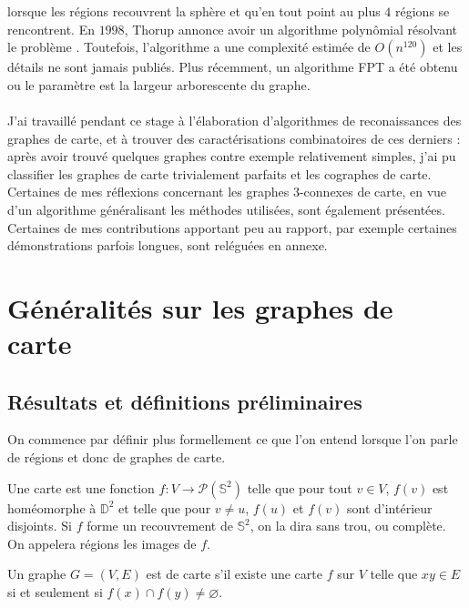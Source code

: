 \documentclass{scrartcl}
\begin{document}
\begin{flushleft}
lorsque les régions recouvrent la sphère et qu'en tout point au plus $4$ régions se rencontrent. En $1998$, Thorup annonce avoir un algorithme
polynômial résolvant le problème \cite{Thorup}. Toutefois, l'algorithme a une complexité estimée de $O(n^{120})$ \cite{n120} et les détails ne
sont jamais publiés. Plus récemment, un algorithme FPT a été obtenu \cite{FptMap} ou le paramètre est la largeur arborescente du graphe.
\\~\\
J'ai travaillé pendant ce stage à l'élaboration d'algorithmes de reconaissances des graphes de carte, et à trouver des caractérisations
combinatoires de ces derniers : après avoir trouvé quelques graphes contre exemple relativement simples, j'ai pu classifier les graphes
de carte trivialement parfaits et les cographes de carte. Certaines de mes réflexions concernant les graphes $3$-connexes de carte, en vue
d'un algorithme généralisant les méthodes utilisées, sont également présentées. Certaines de mes contributions apportant peu au rapport,
par exemple certaines démonstrations parfois longues, sont reléguées en annexe.

\section{Généralités sur les graphes de carte}

\subsection{Résultats et définitions préliminaires}

On commence par définir plus formellement ce que l'on entend lorsque l'on parle de régions et donc de graphes de carte.

\begin{def*}[Carte]
    Une carte est une fonction $f : V \rightarrow \mathcal{P}(\mathbb{S}^2)$ telle que pour tout $v \in V$, $f(v)$
    est homéomorphe à $\mathbb{D}^2$ et telle que pour $v \neq u$, $f(u)$ et $f(v)$ sont d'intérieur disjoints. Si
    $f$ forme un recouvrement de $\mathbb{S}^2$, on la dira sans trou, ou complète. On appelera régions les images
    de $f$.
\end{def*}

\begin{def*}
    Un graphe $G = (V, E)$ est de carte s'il existe une carte $f$ sur $V$ telle que $xy \in E$ si et seulement si
    $f(x) \cap f(y) \neq \varnothing$.
\end{def*}


\end{flushleft}
\end{document}
